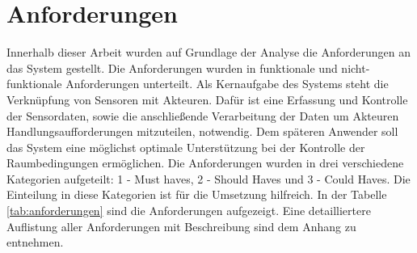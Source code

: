 \section{Anforderungen}
Innerhalb dieser Arbeit wurden auf Grundlage der Analyse die Anforderungen an das System gestellt. Die Anforderungen wurden in funktionale und nicht-funktionale Anforderungen unterteilt. Als Kernaufgabe des Systems steht die Verknüpfung von Sensoren mit Akteuren. Dafür ist eine Erfassung und Kontrolle der Sensordaten, sowie die anschließende Verarbeitung der Daten um Akteuren Handlungsaufforderungen mitzuteilen, notwendig. Dem späteren Anwender soll das System eine möglichst optimale Unterstützung bei der Kontrolle der Raumbedingungen ermöglichen. Die Anforderungen wurden in drei verschiedene Kategorien aufgeteilt: 1 - Must haves, 2 - Should Haves und 3 - Could Haves. Die Einteilung in diese Kategorien ist für die Umsetzung hilfreich. In der Tabelle \ref{tab:anforderungen} sind die Anforderungen aufgezeigt. Eine detailliertere Auflistung aller Anforderungen mit Beschreibung sind dem Anhang zu entnehmen.\\

